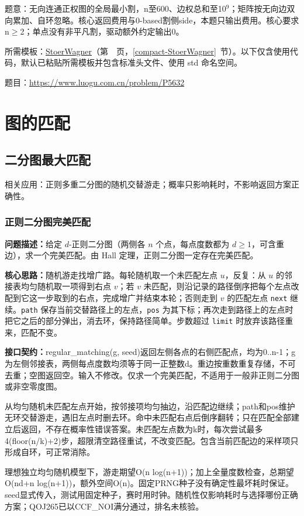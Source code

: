 题意：无向连通正权图的全局最小割，n至600、边权总和至10$^{9}$；矩阵按无向边双向累加、自环忽略。核心返回费用与0-based割侧side，本题只输出费用。核心要求n$\ge$2；单点没有非平凡割，驱动额外约定输出0。

所需模板：\hyperref[compact-StoerWagner]{StoerWagner}（第~\pageref{compact-StoerWagner}~页，\ref{compact-StoerWagner}~节）。以下仅含使用代码，默认已粘贴所需模板并包含标准头文件、使用 std 命名空间。

题目：\url{https://www.luogu.com.cn/problem/P5632}



\Needspace{180pt}

\chapter{图的匹配}

\section{二分图最大匹配}

\noindent 相关应用：正则多重二分图的随机交替游走；概率只影响耗时，不影响返回方案正确性。

\subsection{正则二分图完美匹配}\label{compact-regular_matching}

\noindent\textbf{问题描述：}\allowbreak 给定 $d$-正则二分图（两侧各 $n$ 个点，每点度数都为 $d\ge1$，可含重边），求一个完美匹配。由 Hall 定理，正则二分图一定存在完美匹配。

\textbf{核心思路：}\allowbreak 随机游走找增广路。每轮随机取一个未匹配左点 $u$，反复：从 $u$ 的邻接表均匀随机取一项得到右点 $v$；若 $v$ 未匹配，则沿记录的路径倒序把每个左点改配到它这一步取到的右点，完成增广并结束本轮；否则走到 $v$ 的匹配左点 \texttt{next} 继续。\texttt{path} 保存当前交替路径上的左点，\texttt{pos} 为其下标；再次走到路径上的左点时把它之后的部分弹出，消去环，保持路径简单。步数超过 \texttt{limit} 时放弃该路径重来，匹配不变。



{\sloppy{}\noindent\textbf{接口契约：}regular\_matching(g, seed)返回左侧各点的右侧匹配点，均为0..n-1；g为左侧邻接表，两侧每点度数均须等于同一正整数d。重边按重数重复存储，不可去重；空图返回空。输入不修改。仅求一个完美匹配，不适用于一般非正则二分图或非空零度图。

从均匀随机未匹配左点开始，按邻接项均匀抽边，沿匹配边继续；path和pos维护无环交替游走，遇旧左点时删去环。命中未匹配右点后倒序翻转；只在匹配全部建立后返回，不存在概率性错误答案。未匹配左点数为k时，每次尝试最多4(floor(n/k)+2)步，超限清空路径重试，不改变匹配。包含当前匹配边的采样项只形成自环，可正常消除。

理想独立均匀随机模型下，游走期望O(n log(n+1))；加上全量度数检查，总期望O(nd+n log(n+1))，额外空间O(n)。固定PRNG种子没有确定性最坏耗时保证。seed显式传入，测试用固定种子，赛时用时钟。随机性仅影响耗时与选择哪份正确方案；QOJ265已以CCF\_NOI满分通过，排名未核验。\par}

